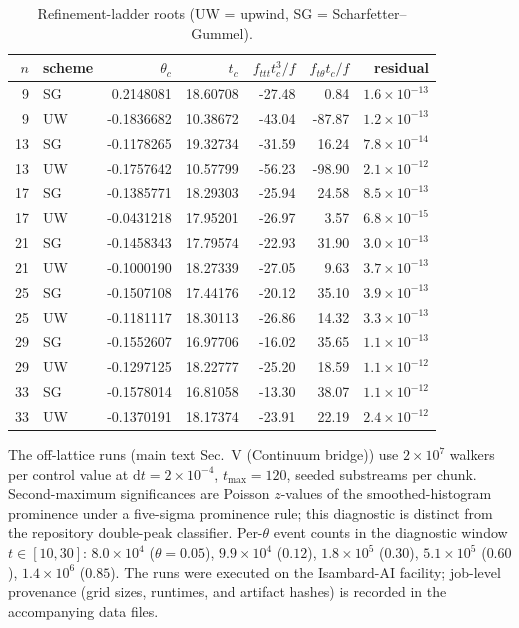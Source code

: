 \documentclass[aps,pre,reprint,amsmath,amssymb,longbibliography,floatfix]{revtex4-2}
\newcommand{\dd}{\mathrm d}
\begin{document}
\begin{table}[h]
\caption{\label{smtab:ladder}Refinement-ladder roots (UW = upwind,
SG = Scharfetter--Gummel).}
\begin{ruledtabular}
\begin{tabular}{rlrrrrr}
\(n\) & scheme & \(\theta_c\) & \(t_c\) & \(f_{ttt}t_c^3/f\) &
\(f_{t\theta}t_c/f\) & residual\\
\hline
9 & SG & 0.2148081 & 18.60708 & -27.48 & 0.84 & \(1.6\times10^{-13}\)\\
9 & UW & -0.1836682 & 10.38672 & -43.04 & -87.87 & \(1.2\times10^{-13}\)\\
13 & SG & -0.1178265 & 19.32734 & -31.59 & 16.24 & \(7.8\times10^{-14}\)\\
13 & UW & -0.1757642 & 10.57799 & -56.23 & -98.90 & \(2.1\times10^{-12}\)\\
17 & SG & -0.1385771 & 18.29303 & -25.94 & 24.58 & \(8.5\times10^{-13}\)\\
17 & UW & -0.0431218 & 17.95201 & -26.97 & 3.57 & \(6.8\times10^{-15}\)\\
21 & SG & -0.1458343 & 17.79574 & -22.93 & 31.90 & \(3.0\times10^{-13}\)\\
21 & UW & -0.1000190 & 18.27339 & -27.05 & 9.63 & \(3.7\times10^{-13}\)\\
25 & SG & -0.1507108 & 17.44176 & -20.12 & 35.10 & \(3.9\times10^{-13}\)\\
25 & UW & -0.1181117 & 18.30113 & -26.86 & 14.32 & \(3.3\times10^{-13}\)\\
29 & SG & -0.1552607 & 16.97706 & -16.02 & 35.65 & \(1.1\times10^{-13}\)\\
29 & UW & -0.1297125 & 18.22777 & -25.20 & 18.59 & \(1.1\times10^{-12}\)\\
33 & SG & -0.1578014 & 16.81058 & -13.30 & 38.07 & \(1.1\times10^{-12}\)\\
33 & UW & -0.1370191 & 18.17374 & -23.91 & 22.19 & \(2.4\times10^{-12}\)\\
\end{tabular}
\end{ruledtabular}
\end{table}

The off-lattice runs (main text Sec.~V (Continuum bridge)) use \(2\times10^7\) walkers per
control value at \(\dd t=2\times10^{-4}\), \(t_{\max}=120\), seeded
substreams per chunk. Second-maximum significances are Poisson
\(z\)-values of the smoothed-histogram prominence under a five-sigma
prominence rule; this diagnostic is distinct from the repository
double-peak classifier. Per-\(\theta\) event counts in the diagnostic
window \(t\in[10,30]\): \(8.0\times10^4\) (\(\theta=0.05\)),
\(9.9\times10^4\) (\(0.12\)), \(1.8\times10^5\) (\(0.30\)),
\(5.1\times10^5\) (\(0.60\)), \(1.4\times10^6\) (\(0.85\)). The runs were executed on the Isambard-AI
facility; job-level provenance (grid sizes, runtimes, and artifact
hashes) is recorded in the accompanying data files.
\end{document}
